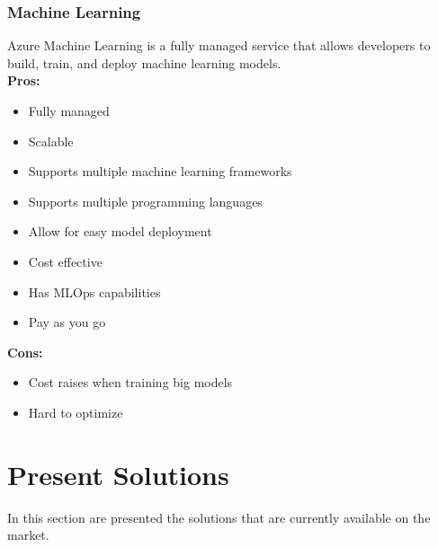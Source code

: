        \subsubsection{Machine Learning}
        \label{azure:machine-learning}
        Azure Machine Learning is a fully managed service that allows developers to build, train, and deploy machine learning models.\\
        \textbf{Pros:}
        \begin{itemize}
            \item Fully managed
            \item Scalable
            \item Supports multiple machine learning frameworks
            \item Supports multiple programming languages
            \item Allow for easy model deployment
            \item Cost effective
            \item Has MLOps capabilities
            \item Pay as you go
        \end{itemize}
        \textbf{Cons:}
        \begin{itemize}
            \item Cost raises when training big models
            \item Hard to optimize 
        \end{itemize}

\section{Present Solutions}
In this section are presented the solutions that are currently available on the market.


